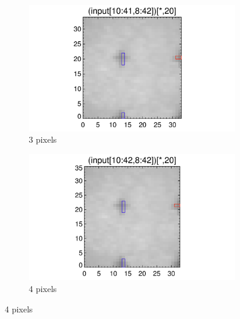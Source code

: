 \documentclass[10pt]{article}
\begin{document}
\begin{figure}[!h]
   \begin{subfigure}[b]{.45\linewidth}
        \centering
        \includegraphics[width=1.3\textwidth]{plots_tables_images/moarfidcheck_withbothtruncate3.png}
        \caption{3 pixels}
    \end{subfigure}
    \begin{subfigure}[b]{.45\linewidth}
        \centering
        \includegraphics[width=1.3\textwidth]{plots_tables_images/moarfidcheck_withbothtruncate4.png}
        \caption{4 pixels}
    \end{subfigure}


\end{figure}
\end{document}
